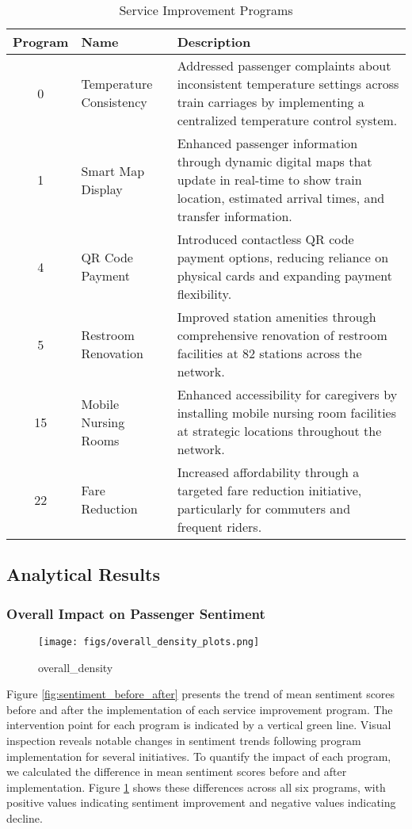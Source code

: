 \documentclass[a4paper,fleqn,12pt]{cas-sc}
\begin{document}
\begin{table}[htbp]
\centering
\caption{Service Improvement Programs}
\begin{tabular}{|c|l|p{9cm}|}
\hline
\textbf{Program} & \textbf{Name} & \textbf{Description} \\
\hline
0 & Temperature Consistency & Addressed passenger complaints about inconsistent temperature settings across train carriages by implementing a centralized temperature control system. \\
\hline
1 & Smart Map Display & Enhanced passenger information through dynamic digital maps that update in real-time to show train location, estimated arrival times, and transfer information. \\
\hline
4 & QR Code Payment & Introduced contactless QR code payment options, reducing reliance on physical cards and expanding payment flexibility. \\
\hline
5 & Restroom Renovation & Improved station amenities through comprehensive renovation of restroom facilities at 82 stations across the network. \\
\hline
15 & Mobile Nursing Rooms & Enhanced accessibility for caregivers by installing mobile nursing room facilities at strategic locations throughout the network. \\
\hline
22 & Fare Reduction & Increased affordability through a targeted fare reduction initiative, particularly for commuters and frequent riders. \\
\hline
\end{tabular}
\end{table}

\subsection{Analytical Results}

\subsubsection{Overall Impact on Passenger Sentiment}

\begin{figure}[h]
\centering
\texttt{[image: figs/overall\_density\_plots.png]}
\caption{overall_density}
\label{fig:impact_comparison}
\end{figure}

Figure \ref{fig:sentiment_before_after} presents the trend of mean sentiment scores before and after the implementation of each service improvement program. The intervention point for each program is indicated by a vertical green line. Visual inspection reveals notable changes in sentiment trends following program implementation for several initiatives. To quantify the impact of each program, we calculated the difference in mean sentiment scores before and after implementation. Figure \ref{fig:impact_comparison} shows these differences across all six programs, with positive values indicating sentiment improvement and negative values indicating decline.
\end{document}
